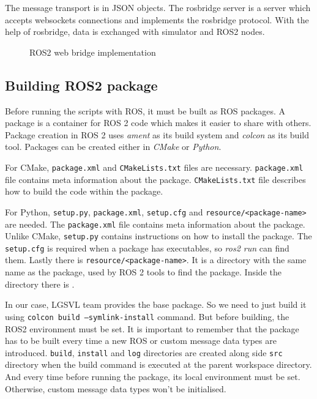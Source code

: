 The message transport is in JSON objects. The rosbridge server is a server which accepts websockets connections and implements the rosbridge protocol.
With the help of rosbridge, data is exchanged with
simulator and ROS2 nodes.

\begin{figure}[h]
	\centering
    \def\svgwidth{0.8\textwidth}
    \caption{ROS2 web bridge implementation}
    \label{fig:ros2webbridge}
\end{figure}

\iffalse
\subsection{Building ROS2 package}
Before running the scripts with ROS, it must be built as ROS packages.  A package is a
container for ROS 2 code which makes it easier to share with others. Package creation in
ROS 2 uses \textit{ament} as its build system and \textit{colcon} as its build tool.
Packages can be created either in \textit{CMake} or \textit{Python}.

For CMake, \texttt{package.xml} and \texttt{CMakeLists.txt} files are necessary. \texttt{package.xml}
file contains meta information about the package. \texttt{CMakeLists.txt} file describes how to build the code within the package.

For Python, \texttt{setup.py}, \texttt{package.xml}, \texttt{setup.cfg} and
\texttt{resource/<package-name>} are needed. The \texttt{package.xml} file contains meta
information about the package. Unlike CMake, \texttt{setup.py} contains instructions on
how to install the package. The \texttt{setup.cfg} is required when a package has
executables, so \textit{ros2 run} can find them. Lastly there is
\texttt{resource/<package-name>}. It is a directory with the same name as the package,
used by ROS 2 tools to find the package. Inside the directory there is \texttt{}.

In our case, LGSVL team provides the base package. So we need to just build it using
\texttt{colcon build --symlink-install} command. But before building, the ROS2 environment
 must be set. It is important to remember that the package has
to be built every time a new ROS or custom message data types are introduced. \texttt{build},
\texttt{install} and \texttt{log} directories are created along side \texttt{src}
directory when the build command is executed at the parent workspace directory. And
every time before running the package, its local environment must be set. Otherwise,
custom message data types won't be initialised.

